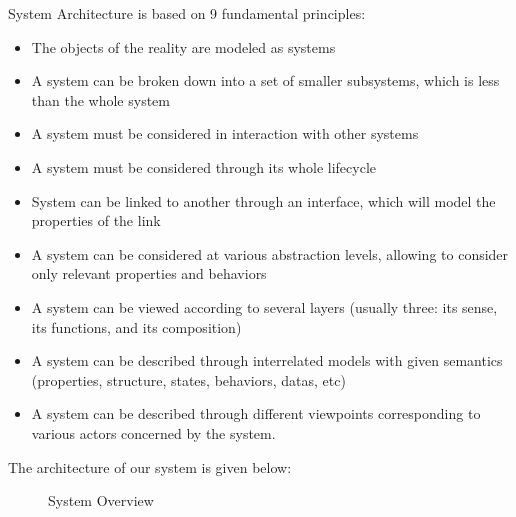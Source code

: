 System Architecture is based on 9 fundamental principles:
\begin{itemize}
	\item The objects of the reality are modeled as systems
	\item A system can be broken down into a set of smaller subsystems, which is less than the whole system
	\item A system must be considered in interaction with other systems
	\item A system must be considered through its whole lifecycle
	\item System can be linked to another through an interface, which will model the properties of the link
	\item A system can be considered at various abstraction levels, allowing to consider only relevant properties and behaviors
	\item A system can be viewed according to several layers (usually three: its sense, its functions, and its composition)
	\item A system can be described through interrelated models with given semantics (properties, structure, states, behaviors, datas, etc)
	\item A system can be described through different viewpoints corresponding to various actors concerned by the system.
\end{itemize}

The architecture of our system is given below:
\begin{figure}[htbp]
	\centering
	\caption{System Overview}
	\label{system_architecture}
\end{figure}

